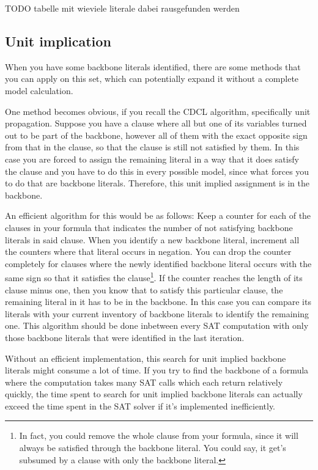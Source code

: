 TODO tabelle mit wieviele literale dabei rausgefunden werden

\fi
\subsection{Unit implication}
\label{subsec:unitImpl}

When you have some backbone literals identified, there are some methods that you can apply on this set, which can potentially expand it without a complete model calculation. 

One method becomes obvious, if you recall the CDCL algorithm, specifically unit propagation. Suppose you have a clause where all but one of its variables turned out to be part of the backbone, however all of them with the exact opposite sign from that in the clause, so that the clause is still not satisfied by them. In this case you are forced to assign the remaining literal in a way that it does satisfy the clause and you have to do this in every possible model, since what forces you to do that are backbone literals. Therefore, this unit implied assignment is in the backbone.

An efficient algorithm for this would be as follows: Keep a counter for each of the clauses in your formula that indicates the number of not satisfying backbone literals in said clause. When you identify a new backbone literal, increment all the counters where that literal occurs in negation. You can drop the counter completely for clauses where the newly identified backbone literal occurs with the same sign so that it satisfies the clause\footnote{
	In fact, you could remove the whole clause from your formula, since it will always be satisfied through the backbone literal. You could say, it get's subsumed by a clause with only the backbone literal.}.
If the counter reaches the length of its clause minus one, then you know that to satisfy this particular clause, the remaining literal in it has to be in the backbone. In this case you can compare its literals with your current inventory of backbone literals to identify the remaining one. This algorithm should be done inbetween every SAT computation with only those backbone literals that were identified in the last iteration.


Without an efficient implementation, this search for unit implied backbone literals might consume a lot of time. If you try to find the backbone of a formula where the computation takes many SAT calls which each return relatively quickly, the time spent to search for unit implied backbone literals can actually exceed the time spent in the SAT solver if it's implemented inefficiently.

